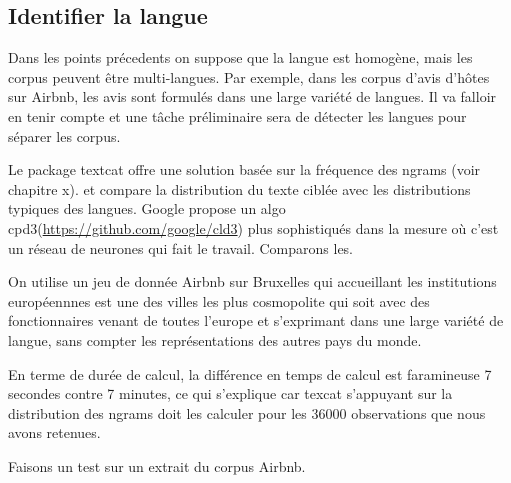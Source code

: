 \documentclass[
]{book}
\begin{document}
\hypertarget{identifier-la-langue}{%
\subsection{Identifier la langue}\label{identifier-la-langue}}

Dans les points précedents on suppose que la langue est homogène, mais les corpus peuvent être multi-langues. Par exemple, dans les corpus d'avis d'hôtes sur Airbnb, les avis sont formulés dans une large variété de langues. Il va falloir en tenir compte et une tâche préliminaire sera de détecter les langues pour séparer les corpus.

Le package textcat offre une solution basée sur la fréquence des ngrams (voir chapitre x). et compare la distribution du texte ciblée avec les distributions typiques des langues. Google propose un algo cpd3(\url{https://github.com/google/cld3}) plus sophistiqués dans la mesure où c'est un réseau de neurones qui fait le travail. Comparons les.

On utilise un jeu de donnée Airbnb sur Bruxelles qui accueillant les institutions européennnes est une des villes les plus cosmopolite qui soit avec des fonctionnaires venant de toutes l'europe et s'exprimant dans une large variété de langue, sans compter les représentations des autres pays du monde.

En terme de durée de calcul, la différence en temps de calcul est faramineuse 7 secondes contre 7 minutes, ce qui s'explique car texcat s'appuyant sur la distribution des ngrams doit les calculer pour les 36000 observations que nous avons retenues.

Faisons un test sur un extrait du corpus Airbnb.
\end{document}
